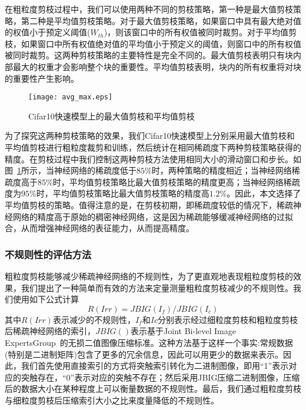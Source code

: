 在粗粒度剪枝过程中，我们可以使用两种不同的剪枝策略，第一种是最大值剪枝策略，第二种是平均值剪枝策略。对于最大值剪枝策略，如果窗口中具有最大绝对值的权值小于预定义阈值($W_{th}$)，则该窗口中的所有权值被同时裁剪。对于平均值剪枝，如果窗口中所有权值绝对值的平均值小于预定义的阈值，则窗口中的所有权值被同时裁剪。这两种剪枝策略的主要特性是完全不同的。最大值剪枝表明只有块内部最大的权重才会影响整个块的重要性。平均值剪枝表明，块内的所有权重将对块的重要性产生影响。

\begin{figure}[h]
  \centering
  \texttt{[image: avg\_max.eps]}
  \caption{Cifar10快速模型上的最大值剪枝和平均值剪枝}
  \label{fig:max_or_avg_pruning}
\end{figure}

为了探究这两种剪枝策略的效果，我们Cifar10快速模型上分别采用最大值剪枝和平均值剪枝进行粗粒度裁剪和训练，然后统计在相同稀疏度下两种剪枝策略获得的精度。在剪枝过程中我们控制这两种剪枝方法使用相同大小的滑动窗口和步长。如图~\ref{fig:max_or_avg_pruning}所示，当神经网络的稀疏度低于$85\%$时，两种策略的精度相近；当神经网络稀疏度高于$85\%$时，平均值剪枝策略比最大值剪枝策略的精度更高；当神经网络稀疏度为$95\%$时，平均值剪枝策略比最大值剪枝策略的精度高$1.2\%$。因此，本文选择了平均值剪枝的策略。值得注意的是，在剪枝初期，即稀疏度较低的情况下，稀疏神经网络的精度高于原始的稠密神经网络，这是因为稀疏能够缓减神经网络的过拟合，从而增强神经网络的表征能力，从而提高精度。


\subsubsection{不规则性的评估方法}
\label{subsubsec:irregularity}

粗粒度剪枝能够减少稀疏神经网络的不规则性，为了更直观地表现粗粒度剪枝的效果，我们提出了一种简单而有效的方法来定量测量粗粒度剪枝减少的不规则性。我们使用如下公式计算
\begin{equation}
R(Irr) = JBIG(I_f)/JBIG(I_c)
\end{equation}
其中$R(Irr)$表示减少的不规则性，$I_{f}$和$I {c}$分别表示经过细粒度剪枝和粗粒度剪枝后稀疏神经网络的索引，$JBIG()$表示基于Joint Bi-level Image ExpertsGroup~\cite{jbig}的无损二值图像压缩标准。这种方法基于这样一个事实:常规数据(特别是二进制矩阵)包含了更多的冗余信息，因此可以用更少的数据来表示。因此，我们首先使用直接索引的方式将突触索引转化为二进制图像，即用“1”表示对应的突触存在，“0”表示对应的突触不存在；然后采用JBIG压缩二进制图像，压缩后的数据大小在某种程度上可以衡量数据的不规则性。最后，我们通过粗粒度剪枝与细粒度剪枝后压缩索引大小之比来度量降低的不规则性。

